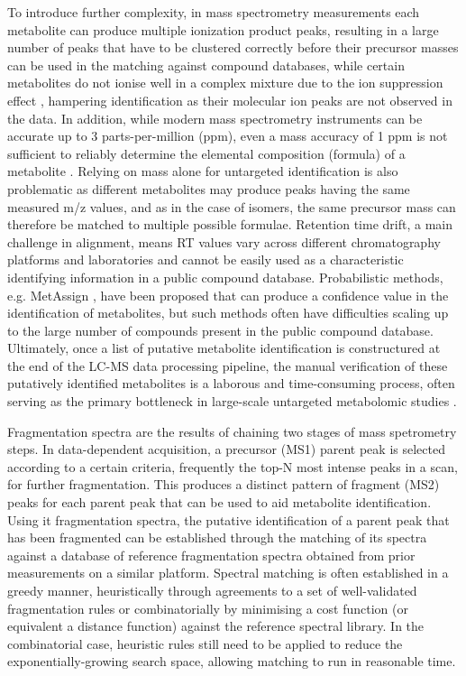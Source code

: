 To introduce further complexity, in mass spectrometry measurements each metabolite can produce multiple ionization product peaks, resulting in a large number of peaks that have to be clustered correctly before their precursor masses can be used in the matching against compound databases, while certain metabolites do not ionise well in a complex mixture due to the ion suppression effect \cite{Annesley2003}, hampering identification as their molecular ion peaks are not observed in the data. In addition, while modern mass spectrometry instruments can be accurate up to 3 parts-per-million (ppm), even a mass accuracy of 1 ppm is not sufficient to reliably determine the elemental composition (formula) of a metabolite \cite{Kind2007}. Relying on mass alone for untargeted identification is also problematic as different metabolites may produce peaks having the same measured m/z values, and as in the case of isomers, the same precursor mass can therefore be matched to multiple possible formulae. Retention time drift, a main challenge in alignment, means RT values vary across different chromatography platforms and laboratories and cannot be easily used as a characteristic identifying information in a public compound database. Probabilistic methods, e.g. MetAssign \cite{Daly2014}, have been proposed that can produce a confidence value in the identification of metabolites, but such methods often have difficulties scaling up to the large number of compounds present in the public compound database. Ultimately, once a list of putative metabolite identification is constructured at the end of the LC-MS data processing pipeline, the manual verification of these putatively identified metabolites is a laborous and time-consuming process, often serving as the primary bottleneck in large-scale untargeted metabolomic studies \cite{Dunn2012, DaSilva2015}.

Fragmentation spectra are the results of chaining two stages of mass spetrometry steps. In data-dependent acquisition, a precursor (MS1) parent peak is selected according to a certain criteria, frequently the top-N most intense peaks in a scan, for further fragmentation. This produces a distinct pattern of fragment (MS2) peaks for each parent peak that can be used to aid metabolite identification. Using it fragmentation spectra, the putative identification of a parent peak that has been fragmented can be established through the matching of its spectra against a database of reference fragmentation spectra obtained from prior measurements on a similar platform. Spectral matching is often established in a greedy manner, heuristically through agreements to a set of well-validated fragmentation rules or combinatorially by minimising a cost function (or equivalent a distance function) against the reference spectral library. In the combinatorial case, heuristic rules still need to be applied to reduce the exponentially-growing search space, allowing matching to run in reasonable time. 

